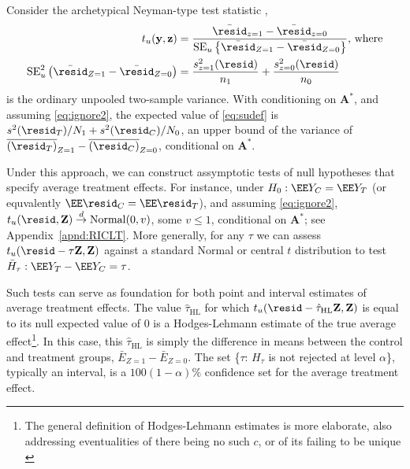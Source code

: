 Consider the archetypical
Neyman-type test statistic \citeyearpar{neyman:1923,neyman1934stratifiedsampling}, %
\begin{align} \label{eq:tudef}
t_{u}({\mathbf{y}},\mathbf{z}) &=
\frac{\bar{\resid}_{z=1} -
                             \bar{\resid}_{z=0}}{
\mathrm{SE}_{u} \left\{ \bar{\resid}_{Z=1} -  \bar{\resid}_{Z=0} \right\}
                             },\, \text{where}
\\
\mathrm{SE}_{u}^2 \left( \bar{\resid}_{Z=1} -  \bar{\resid}_{Z=0} \right) &= \frac{s_{z=1}^{2}({\mathbf{\resid}})}{n_{1}} +
    \frac{s_{z=0}^{2}({\mathbf{\resid}})}{n_{0}}  \label{eq:sudef}
\end{align}
is the ordinary unpooled two-sample variance. With conditioning on
$\mathbf{A}^{*}$, and assuming \eqref{eq:ignore2}, the expected value
of \eqref{eq:sudef} is
${s^{2}({\mathbf{\resid}_{T}})}/{N_{1}} +
{s^{2}({\mathbf{\resid}_{C}})}/{N_{0}}$, an upper bound of the variance of
$\overline{(\resid_{T})}_{Z=1} - \overline{(\resid_{C})}_{Z=0}$, conditional on
$\mathbf{A}^*$.

Under this approach, we can construct assymptotic tests of null
hypotheses that specify average treatment effects.
For instance, under $H_{0}:\EE Y_C=\EE Y_T$ (or
equvalently $\EE \resid_C=\EE \resid_T$), and assuming \eqref{eq:ignore2},
$t_{u}(\mathbf{\resid}, \mathbf{Z})\stackrel{d}{\rightarrow}\mathrm{Normal}(0,v)$,
some $v\leq 1$, conditional on $\mathbf{A}^{*}$; see
Appendix~\ref{apnd:RICLT}.
More generally, for any $\tau$ we can assess
$t_{u}(\mathbf{\resid}-\tau\mathbf{Z}, \mathbf{Z})$ against a standard Normal
or central $t$ distribution to test
$\bar{H}_{\tau}: \EE Y_T-\EE Y_C=\tau$.

Such tests can serve as foundation for both point and interval
estimates of average treatment effects.
The value $\hat{\tau}_{\text{HL}}$ for which $t_{u}(\mathbf{\resid}-\hat{\tau}_{\text{HL}}\mathbf{Z},
\mathbf{Z})$ is equal to its null expected value of 0 is a Hodges-Lehmann estimate of the true average effect\footnote{The general definition of
Hodges-Lehmann estimates is more elaborate, also addressing eventualities
of there being no such $c$, or of its failing to be unique
\citep[e.g.,][Sec.~2.7.2]{rosenbaum:2002}}.
In this case, this $\hat{\tau}_{\text{HL}}$ is simply the difference in means between the
control and treatment groups, $\bar{E}_{Z=1}-\bar{E}_{Z=0}$.
The set \{$\tau$: $H_{\tau}$ is not rejected at level $\alpha$\}, typically an interval, is a
$100(1-\alpha)\%$ confidence set for the average treatment effect.

